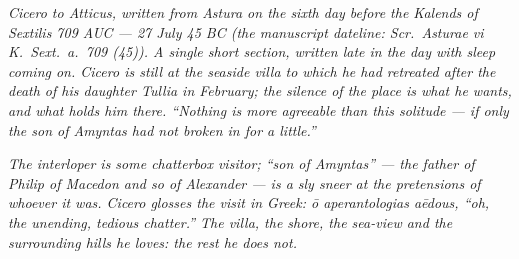 
\textit{Cicero to Atticus, written from Astura on the
sixth day before the Kalends of Sextilis 709 AUC ---
27 July 45 BC (the manuscript dateline: \textit{Scr.\
Asturae vi K.\ Sext.\ a.\ 709 (45)}). A single short
section, written late in the day with sleep coming on.
Cicero is still at the seaside villa to which he had
retreated after the death of his daughter Tullia in
February; the silence of the place is what he wants,
and what holds him there. ``Nothing is more agreeable
than this solitude --- if only the son of Amyntas had
not broken in for a little.''}

\textit{The interloper is some chatterbox visitor;
``son of Amyntas'' --- the father of Philip of Macedon
and so of Alexander --- is a sly sneer at the
pretensions of whoever it was. Cicero glosses the
visit in Greek: \textit{\=o aperantologias a\=edous},
``oh, the unending, tedious chatter.'' The villa, the
shore, the sea-view and the surrounding hills he
loves: the rest he does not.}
